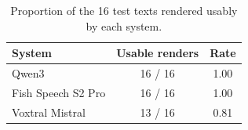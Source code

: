 \begin{table}[H]
    \centering
    \small
    \begin{tabular}{lcc}
        \toprule
        \textbf{System} & \textbf{Usable renders} & \textbf{Rate} \\
        \midrule
        Qwen3 & 16 / 16 & 1.00 \\
        Fish Speech S2 Pro & 16 / 16 & 1.00 \\
        Voxtral Mistral & 13 / 16 & 0.81 \\
        \bottomrule
    \end{tabular}
    \caption{Proportion of the 16 test texts rendered usably by each system.}
    \label{tab:render_reliability}
\end{table}
